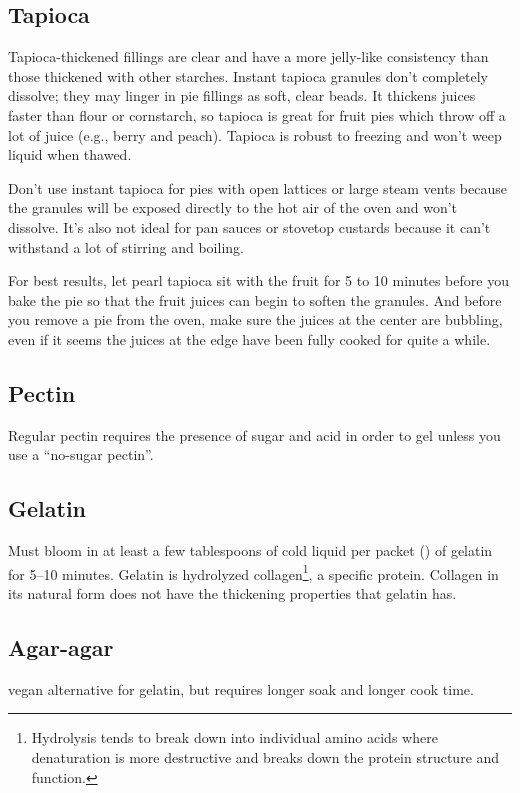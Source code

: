 \subsection{Tapioca} Tapioca-thickened fillings are clear and have a more
jelly-like consistency than those thickened with other starches. Instant
tapioca granules don't completely dissolve; they may linger in pie fillings
as soft, clear beads. It thickens juices faster than flour or cornstarch,
so tapioca is great for fruit pies which throw off a lot of juice (e.g.,
berry and peach). Tapioca is robust to freezing and won't weep liquid when
thawed.

Don't use instant tapioca for pies with open lattices or large steam vents
because the granules will be exposed directly to the hot air of the oven
and won't dissolve. It's also not ideal for pan sauces or stovetop custards
because it can't withstand a lot of stirring and boiling.

For best results, let pearl tapioca sit with the fruit for 5 to 10 minutes
before you bake the pie so that the fruit juices can begin to soften the
granules. And before you remove a pie from the oven, make sure the juices
at the center are bubbling, even if it seems the juices at the edge have
been fully cooked for quite a while.

\subsection{Pectin} Regular pectin requires the presence of sugar and
acid in order to gel unless you use a ``no-sugar pectin''.

\subsection{Gelatin} Must bloom in at least a few tablespoons of cold liquid per
packet (\fourth \oz) of gelatin for 5--10 minutes. Gelatin is hydrolyzed
collagen\footnote{Hydrolysis tends to break down into individual amino acids where
  denaturation is more destructive and breaks down the protein structure and
  function.}, a specific protein. Collagen in its natural form does not have the
thickening properties that gelatin has.

\subsection{Agar-agar} vegan alternative for gelatin, but requires
longer soak and longer cook time.


